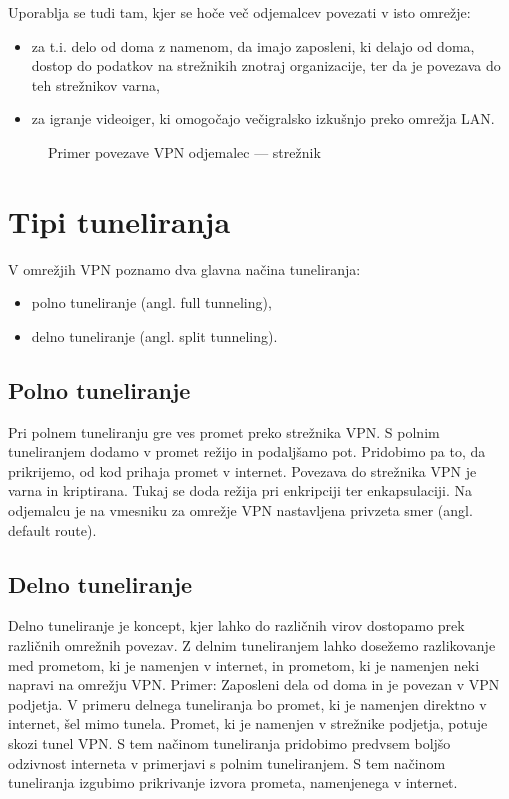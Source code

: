 \documentclass[a4paper, 12pt]{book}
\begin{document}
Uporablja se tudi tam, kjer se hoče več odjemalcev povezati v isto omrežje:
\begin{itemize}
    \itemsep0em 
    \item za t.i. delo od doma z namenom, da imajo zaposleni, ki delajo od doma, dostop do podatkov na strežnikih znotraj organizacije, ter da je povezava do teh strežnikov varna,
    \item za igranje videoiger, ki omogočajo večigralsko izkušnjo preko omrežja LAN.
\end{itemize}



\begin{figure}[H]
\begin{center}

\end{center}
\caption{Primer povezave VPN odjemalec --- strežnik \cite{rvidmar}}%
\label{odjemalec-streznik}
\end{figure}

\section{Tipi tuneliranja}
V omrežjih VPN poznamo dva glavna načina tuneliranja:
\begin{itemize}
    \item polno tuneliranje (angl. full tunneling),
    \item delno tuneliranje (angl. split tunneling).
\end{itemize}

\subsection{Polno tuneliranje}

Pri polnem tuneliranju gre ves promet preko strežnika VPN. S polnim tuneliranjem dodamo v promet režijo in podaljšamo pot. Pridobimo pa to, da prikrijemo, od kod prihaja promet v internet. Povezava do strežnika VPN je varna in kriptirana. Tukaj se doda režija pri enkripciji ter enkapsulaciji. Na odjemalcu je na vmesniku za omrežje VPN nastavljena privzeta smer (angl. default route).

\subsection{Delno tuneliranje}
Delno tuneliranje je koncept, kjer lahko do različnih virov dostopamo prek različnih omrežnih povezav. Z delnim tuneliranjem lahko dosežemo razlikovanje med prometom, ki je namenjen v internet, in prometom, ki je namenjen neki napravi na omrežju VPN. Primer: Zaposleni dela od doma in je povezan v VPN podjetja. V primeru delnega tuneliranja bo promet, ki je namenjen direktno v internet, šel mimo tunela. Promet, ki je namenjen v strežnike podjetja, potuje skozi tunel VPN. S tem načinom tuneliranja pridobimo predvsem boljšo odzivnost interneta v primerjavi s polnim tuneliranjem. S tem načinom tuneliranja izgubimo prikrivanje izvora prometa, namenjenega v internet.
\end{document}
